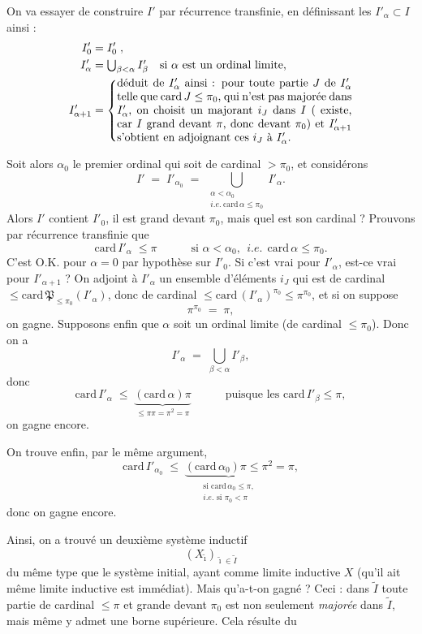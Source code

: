 \documentclass[11pt]{article}
\newcommand{\printedpage}[1]{\marginpar{\footnotesize p.~#1}}
\newcommand{\msp}[1]{\marginpar{\footnotesize [#1]}}
\newcommand{\card}{\mathrm{card}\,}
\begin{document}
On va essayer de construire $I'$ par récurrence transfinie, en définissant les $I'_\alpha\subset I$ ainsi :
\[
\begin{aligned}
I'_0 &= I'_0\;, \\
I'_\alpha &= \textstyle\bigcup_{\beta<\alpha} I'_\beta \quad \text{si $\alpha$ est un ordinal limite,} \\
I'_{\alpha+1} &= \left\{\parbox{0.6\textwidth}{déduit de $I'_\alpha$ ainsi : pour toute partie $J$ de $I'_\alpha$ telle que $\card J\le\pi_0$, qui n'est pas majorée dans $I'_\alpha$, on choisit un majorant $i_J$ dans $I$ ( existe, car $I$ grand devant $\pi$, donc devant $\pi_0$) et $I'_{\alpha+1}$ s'obtient en adjoignant ces $i_J$ à $I'_\alpha$.}\right.
\end{aligned}
\]

\msp{page 81}
Soit alors $\alpha_0$ le premier ordinal qui soit de cardinal $>\pi_0$, et considérons
\[
I' \;=\; I'_{\alpha_0} \;=\; \bigcup\limits_{\substack{\alpha<\alpha_0\\ \textit{i.e.}\ \card\alpha\le\pi_0}} I'_\alpha .
\]
Alors $I'$ contient $I'_0$, il est grand devant $\pi_0$, mais quel est son cardinal ? Prouvons par récurrence transfinie que
\[
\card I'_\alpha \;\le\pi \qquad\quad \text{si } \alpha<\alpha_0,\ \ \textit{i.e.}\ \ \card\alpha\le\pi_0 .
\]
C'est O.K. pour $\alpha=0$ par hypothèse sur $I'_0$. Si c'est vrai pour $I'_\alpha$, est-ce vrai pour $I'_{\alpha+1}$ ? On adjoint à $I'_\alpha$ un ensemble d'éléments $i_J$ qui est de cardinal $\le\card\mathfrak{P}_{\le\pi_0}(I'_\alpha)$, donc de cardinal $\le\card(I'_\alpha)^{\pi_0}\le\pi^{\pi_0}$, et si on suppose
\[
\pi^{\pi_0} \;=\; \pi,
\]
on gagne. Supposons enfin que $\alpha$ soit un ordinal limite (de cardinal $\le\pi_0$). Donc on a
\[
I'_\alpha \;=\; \bigcup_{\beta<\alpha} I'_\beta ,
\]
donc
\printedpage{45}
\msp{page 82}
\[
\card I'_\alpha \;\le\; \underbrace{(\card\alpha)\pi}_{\le\pi\pi=\pi^2=\pi} \qquad\quad \text{puisque les } \card I'_\beta\le\pi,
\]
on gagne encore.

On trouve enfin, par le même argument,
\[
\card I'_{\alpha_0} \;\le\; \underbrace{(\card\alpha_0)\pi\le\pi^2}_{\substack{\text{si }\card\alpha_0\le\pi,\\ \textit{i.e.}\text{ si }\pi_0<\pi}} = \pi,
\]
donc on gagne encore.

Ainsi, on a trouvé un deuxième système inductif
\[
(X_{\tilde\imath})_{\tilde\imath\in\tilde I}
\]
du même type que le système initial, ayant comme limite inductive $X$ (qu'il ait même limite inductive est immédiat). Mais qu'a-t-on gagné ? Ceci : dans $\tilde I$ toute partie de cardinal $\le\pi$ et grande devant $\pi_0$ est non seulement \textit{majorée} dans $\tilde I$, mais même y admet une borne supérieure. Cela résulte du %
\end{document}
